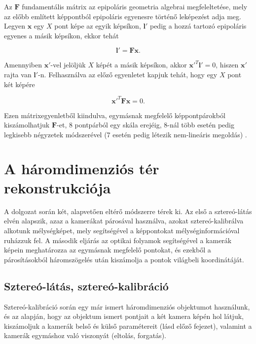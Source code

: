 Az $\mathbf{F}$ fundamentális mátrix az epipoláris geometria algebrai megfeleltetése, mely az előbb említett képpontból epipoláris egyenesre történő leképezést adja meg. Legyen $\mathbf{x}$ egy $X$ pont képe az egyik képsíkon, $\mathbf{l}'$ pedig a hozzá tartozó epipoláris egyenes a másik képsíkon, ekkor tehát

\[\mathbf{l}' = \mathbf{F}\mathbf{x}.\]

Amennyiben $\mathbf{x}'$-vel jelöljük $X$ képét a másik képsíkon, akkor $\mathbf{x}'^T \mathbf{l}' = 0$, hiszen $\mathbf{x}'$ rajta van $\mathbf{l}'$-n. Felhasználva az előző egyenletet kapjuk tehát, hogy egy $X$ pont két képére

\[\mathbf{x}'^T\mathbf{F}\mathbf{x} = 0.\]

Ezen mátrixegyenletből kiindulva, egymásnak megfelelő képpontpárokból kiszámolhatjuk $\mathbf{F}$-et, 8 pontpárból egy skála erejéig, 8-nál több esetén pedig legkisebb négyzetek módszerével (7 esetén pedig létezik nem-lineáris megoldás) \cite[10.1 alfejezet]{HZ}.

\section{A háromdimenziós tér rekonstrukciója \label{sec:methods}}


A dolgozat során két, alapvetően eltérő módszerre térek ki. Az első a sztereó-látás elvén alapszik, azaz a kamerákat párosával használva, azokat sztereó-kalibrálva alkotunk mélységképet, mely segítségével a képpontokat mélységinformációval ruházzuk fel. A második eljárás az optikai folyamok segítségével a kamerák képein meghatározza az egymásnak megfelelő pontokat, és ezekből a párosításokból háromszögelés után kiszámolja a pontok világbeli koordinátáját.

\subsection{Sztereó-látás, sztereó-kalibráció}

Sztereó-kalibráció \cite{camera-calib-3d} során egy már ismert háromdimenziós objektumot használunk, és az alapján, hogy az objektum ismert pontjait a két kamera képén hol látjuk, kiszámoljuk a kamerák belső és külső paramétereit (lásd előző fejezet), valamint a kamerák egymáshoz való viszonyát (eltolás, forgatás). 

